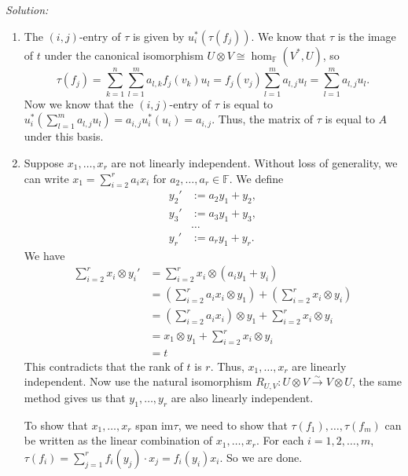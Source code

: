 \documentclass[a4paper, 12pt]{article}
\newenvironment{solution}
    {\textit{Solution:}}
    {}
\begin{document}
\begin{solution}
\begin{enumerate}[(1)]
\item The \((i,j)\)-entry of \(\tau\) is given by \(u_i^*(\tau(f_j))\). We know that \(\tau\) is the image of \(t\) under the canonical isomorphism 
      \(U\otimes V\cong \hom_\mathbb{F}(V^*,U)\), so 
	  \[\tau(f_j)=\sum_{k=1}^{n}\sum_{l=1}^{m} a_{l,k} f_j(v_k)u_l=f_j(v_j)\sum_{l=1}^{m}a_{l,j}u_l=\sum_{l=1}^{m}a_{l,j}u_l.\]
	  Now we know that the \((i,j)\)-entry of \(\tau\) is equal to \(u_i^*(\sum_{l=1}^{m}a_{l,j}u_l)=a_{i,j}u_i^*(u_i)=a_{i,j}\). Thus, the matrix of \(\tau\) is equal to \(A\) under this basis.
\item Suppose \(x_1,\ldots,x_r\) are not linearly independent. Without loss of generality, we can write \(x_1=\sum_{i=2}^{r}a_ix_i\) for \(a_2,\ldots,a_r\in \mathbb{F}\). We define 
     \begin{align*}
		y_2'&:=a_2y_1+y_2,\\ 
        y_3'&:=a_3y_1+y_3,\\ 
		&\ldots\\ 
        y_r'&:=a_ry_1+y_r.
	 \end{align*}
	 We have 
	 \begin{align*}
		\sum_{i=2}^{r}x_i\otimes y_i' & =\sum_{i=2}^{r} x_i\otimes (a_iy_1+y_i)\\ 
		                              & =(\sum_{i=2}^{r}a_ix_i\otimes y_1)+(\sum_{i=2}^{r}x_i\otimes y_i)\\ 
									  & =(\sum_{i=2}^{r}a_ix_i)\otimes y_1+\sum_{i=2}^{r}x_i\otimes y_i\\ 
									  & =x_1\otimes y_1+\sum_{i=2}^{r}x_i\otimes y_i\\ 
									  & =t
	 \end{align*}
	 This contradicts that the rank of \(t\) is \(r\). Thus, \(x_1,\ldots,x_r\) are linearly independent. Now use the natural isomorphism \(R_{U,V}:U\otimes V\xrightarrow{\sim} V\otimes U\), the same 
	 method gives us that \(y_1,\ldots,y_r\) are also linearly independent. 
	 \par 
	 To show that \(x_1,\ldots,x_r\) span \(\text{im}\tau\), we need to show that \(\tau(f_1),\ldots,\tau(f_m)\) can be written as the linear combination of \(x_1,\ldots,x_r\). For each \(i=1,2,\ldots,m\), 
	 \(\tau(f_i)=\sum_{j=1}^{r}f_i(y_j)\cdot x_j=f_i(y_i)x_i\). So we are done.
\end{enumerate}
\end{solution}
\end{document}
